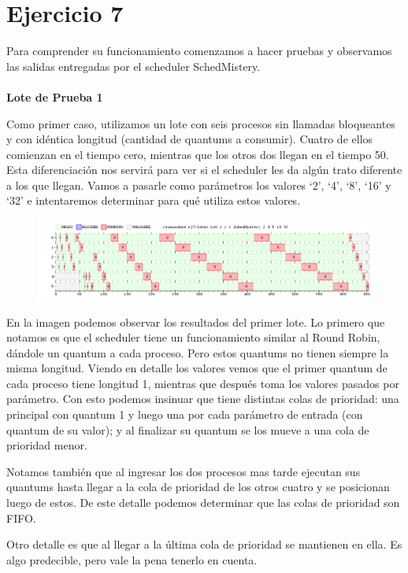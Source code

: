 \section{Ejercicio 7}

\par Para comprender su funcionamiento comenzamos a hacer pruebas y observamos las salidas entregadas por el scheduler SchedMistery.\\\\

\textbf{Lote de Prueba 1}
\\
\par Como primer caso, utilizamos un lote con seis procesos sin llamadas bloqueantes y con idéntica longitud (cantidad de quantums a consumir). Cuatro de ellos comienzan en el tiempo cero, mientras que los otros dos llegan en el tiempo 50. Esta diferenciación nos servirá para ver si el scheduler les da algún trato diferente a los que llegan. Vamos a pasarle como parámetros los valores `2', `4', `8', `16' y `32' e intentaremos determinar para qué utiliza estos valores.

\begin{figure}[h]
  \centering
    \includegraphics[width=1\textwidth]{images/ej7/lote1.png}
  \label{fig: lote7_1}
\end{figure}

\par En la imagen podemos observar los resultados del primer lote. Lo primero que notamos es que el scheduler tiene un funcionamiento similar al Round Robin, dándole un quantum a cada proceso. Pero estos quantums no tienen siempre la misma longitud. Viendo en detalle los valores vemos que el primer quantum de cada proceso tiene longitud 1, mientras que después toma los valores pasados por parámetro. Con esto podemos insinuar que tiene distintas colas de prioridad: una principal con quantum 1 y luego una por cada parámetro de entrada (con quantum de su valor); y al finalizar su quantum se los mueve a una cola de prioridad menor.
\par Notamos también que al ingresar los dos procesos mas tarde ejecutan sus quantums hasta llegar a la cola de prioridad de los otros cuatro y se posicionan luego de estos. De este detalle podemos determinar que las colas de prioridad son FIFO.
\par Otro detalle es que al llegar a la última cola de prioridad se mantienen en ella. Es algo predecible, pero vale la pena tenerlo en cuenta.\\\\

